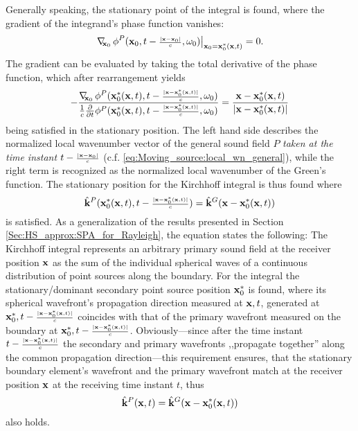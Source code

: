 Generally speaking, the stationary point of the integral is found, where the gradient of the integrand's phase function vanishes:
\begin{equation}
\left. \nabla_{\!\!\mathbf{x}_0}\, \phi^P(\mathbf{x}_0,t-{\scriptstyle \frac{|\mathbf{x}-\mathbf{x}_0|}{c} },\omega_0) \right|_{\mathbf{x}_0 = \mathbf{x}_0^*(\mathbf{x},t)} = 0.
\end{equation} 
The gradient can be evaluated by taking the total derivative of the phase function, which after rearrangement yields
\begin{equation}
-\frac{\nabla_{\!\!\mathbf{x}_0}\, \phi^P(\mathbf{x}_0^*(\mathbf{x},t),t-{\scriptstyle \frac{|\mathbf{x}-\mathbf{x}_0^*(\mathbf{x},t)|}{c} },\omega_0) }{\frac{1}{c}\frac{\partial }{\partial t}\phi^P(\mathbf{x}_0^*(\mathbf{x},t),t-{\scriptstyle \frac{|\mathbf{x}-\mathbf{x}_0^*(\mathbf{x},t)|}{c} },\omega_0) } = \frac{\mathbf{x}-\mathbf{x}_0^*(\mathbf{x},t)}{|\mathbf{x}-\mathbf{x}_0^*(\mathbf{x},t)|}
\end{equation}
being satisfied in the stationary position.
The left hand side describes the normalized local wavenumber vector of the general sound field $P$ \emph{taken at the time instant $t-{\scriptstyle \frac{|\mathbf{x}-\mathbf{x}_0|}{c} }$} (c.f. \eqref{eq:Moving_source:local_wn_general}), while the right term is recognized as the normalized local wavenumber of the Green's function. 
The stationary position for the Kirchhoff integral is thus found where
\begin{equation}
\label{Eq:moving_sources:moving_point_stat_point_1}
\hat{\mathbf{k}}^P(\mathbf{x}_0^*(\mathbf{x},t),t-{\scriptstyle \frac{|\mathbf{x}-\mathbf{x}_0^*(\mathbf{x},t)|}{c} }) = \hat{\mathbf{k}}^G(\mathbf{x}-\mathbf{x}_0^*(\mathbf{x},t))
\end{equation}
is satisfied.
As a generalization of the results presented in Section \ref{Sec:HS_approx:SPA_for_Rayleigh}, the equation states the following:
The Kirchhoff integral represents an arbitrary primary sound field at the receiver position $\mathbf{x}$ as the sum of the individual spherical waves of a continuous distribution of point sources along the boundary.
For the integral the stationary/dominant secondary point source position $\mathbf{x}_0^*$ is found, where its spherical wavefront's propagation direction measured at $\mathbf{x},t$, generated at $\mathbf{x}_0^*, t-{\scriptstyle \frac{|\mathbf{x}-\mathbf{x}_0^*(\mathbf{x},t)|}{c} }$ coincides with that of the primary wavefront measured on the boundary at $\mathbf{x}_0^*, t-{\scriptstyle \frac{|\mathbf{x}-\mathbf{x}_0^*(\mathbf{x},t)|}{c} }$.
Obviously---since after the time instant $t-{\scriptstyle \frac{|\mathbf{x}-\mathbf{x}_0^*(\mathbf{x},t)|}{c} }$ the secondary and primary wavefronts ,,propagate together'' along the common propagation direction---this requirement ensures, that the stationary boundary element's wavefront and the primary wavefront match at the receiver position $\mathbf{x}$ at the receiving time instant $t$, thus 
\begin{equation}
\hat{\mathbf{k}}^P(\mathbf{x},t) = \hat{\mathbf{k}}^G(\mathbf{x}-\mathbf{x}_0^*(\mathbf{x},t))
\end{equation}
also holds.
%
